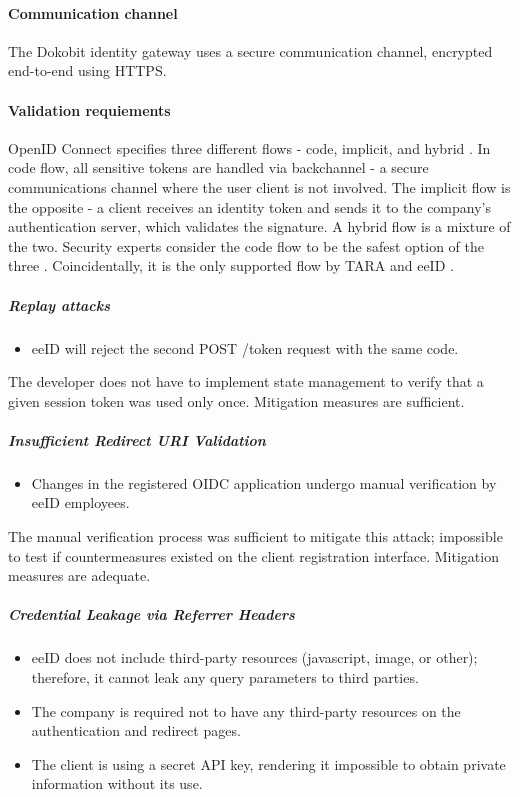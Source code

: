 \paragraph{Communication channel}

The Dokobit identity gateway uses a secure communication channel, encrypted end-to-end using HTTPS.

\paragraph{Validation requiements}

OpenID Connect specifies three different flows - code, implicit, and hybrid \cite{oidc}. In code flow, all sensitive tokens are handled via backchannel - a secure communications channel where the user client is not involved. The implicit flow is the opposite - a client receives an identity token and sends it to the company's authentication server, which validates the signature. A hybrid flow is a mixture of the two. Security experts consider the code flow to be the safest option of the three \cite{ietf-oauth-security-topics-19}. Coincidentally, it is the only supported flow by TARA and eeID \cite{tara-technical}.

\subparagraph{Replay attacks}

\begin{itemize}
  \item eeID will reject the second POST /token request with the same code.
\end{itemize}

The developer does not have to implement state management to verify that a given session token was used only once. Mitigation measures are sufficient.

\subparagraph{Insufficient Redirect URI Validation}

\begin{itemize}
  \item Changes in the registered OIDC application undergo manual verification by eeID employees.
\end{itemize}

The manual verification process was sufficient to mitigate this attack; impossible to test if countermeasures existed on the client registration interface. Mitigation measures are adequate.
\subparagraph{Credential Leakage via Referrer Headers}

\begin{itemize}
  \item eeID does not include third-party resources (javascript, image, or other); therefore, it cannot leak any query parameters to third parties.
  \item The company is required not to have any third-party resources on the authentication and redirect pages.
  \item The client is using a secret API key, rendering it impossible to obtain private information without its use.
\end{itemize}

